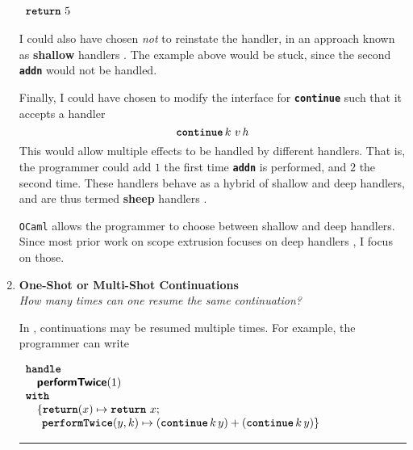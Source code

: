 \begin{enumerate}
\begin{efflst}
          \textcolor{effComment}{$\begin{array}{l}\texttt{\textbf{return}} \,\, {5}\end{array}$}
        \end{efflst}

        I could also have chosen \textit{not} to reinstate the handler, in an approach known as \textbf{shallow} handlers \citep{hillestrom-2018}. The example above would be stuck, since the second \textbf{\texttt{addn}} would not be handled.

        Finally, I could have chosen to modify the interface for \textbf{\texttt{continue}} such that it accepts a handler
        \[\textbf{\texttt{continue}} \, k \,  \, v \, h\]
        This would allow multiple effects to be handled by different handlers. That is, the programmer could add $1$ the first time \textbf{\texttt{addn}} is performed, and $2$ the second time. These handlers behave as a hybrid of shallow and deep handlers, and are thus termed \textbf{sheep} handlers \citep{phipps-costin-2023}. 
         
        \texttt{OCaml} allows the programmer to choose between shallow and deep handlers. Since most prior work on scope extrusion focuses on deep handlers \citep{isoda-24}, I focus on those. 

        \item \textbf{\textsf{One-Shot or Multi-Shot Continuations}}\\
        \textit{How many times can one resume the same continuation?}
 
        In \efflang{}, continuations may be resumed multiple times. For example, the programmer can write 
        
        \begin{efflst}
          $\begin{array}{l}
            \textbf{\texttt{handle}} \\
            \quad \textbf{\textsf{performTwice}}(1) \\
            \textbf{\texttt{with}} \\
            \quad \{ \textbf{\texttt{return}}(x) \mapsto {\texttt{\textbf{return}} \,\, {x}}; \\
            \quad \; \, \textbf{\texttt{performTwice}}(y, k) \mapsto (\textbf{\texttt{continue}} \, {k} \, {y}) + (\textbf{\texttt{continue}} \, {k} \, {y}) \}\\
          \end{array}$
          \vspace{2mm} 
          \textcolor{effComment}{\hrule height 0.2mm \relax}
          \vspace{2mm} 
          

\end{efflst}
\end{enumerate}
